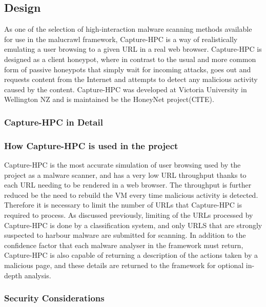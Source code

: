 \subsection{Design}

As one of the selection of high-interaction malware scanning
methods available for use in the malucrawl framework,
Capture-HPC\cite{capture-hpc} is a way of
realistically emulating a user browsing to a given URL in a real web browser.
Capture-HPC is designed as a client honeypot, where in contrast to the usual and
more common form of passive honeypots that simply wait for incoming attacks,
goes out and requests content from the Internet and attempts to detect any
malicious activity caused by the content. Capture-HPC was developed at Victoria
University in Wellington NZ and is maintained be the HoneyNet project(CITE).

\subsubsection{Capture-HPC in Detail}


\subsubsection{How Capture-HPC is used in the project}

Capture-HPC is the most accurate simulation of user browsing used by the project
as a malware scanner, and has a very low URL throughput thanks to each URL
needing to be rendered in a web browser. The throughput is further reduced be
the need to rebuild the VM every time malicious activity is detected. Therefore
it is necessary to limit the number of URLs that Capture-HPC is required to
process. As discussed previously, limiting of the URLs processed by Capture-HPC
is done by a classification system, and only URLS that are strongly suspected to
harbour malware are submitted for scanning. In addition to the confidence factor
that each malware analyser in the framework must return, Capture-HPC is also
capable of returning a description of the actions taken by a malicious page, and
these details are returned to the framework for optional in-depth analysis.

\subsubsection{Security Considerations}

